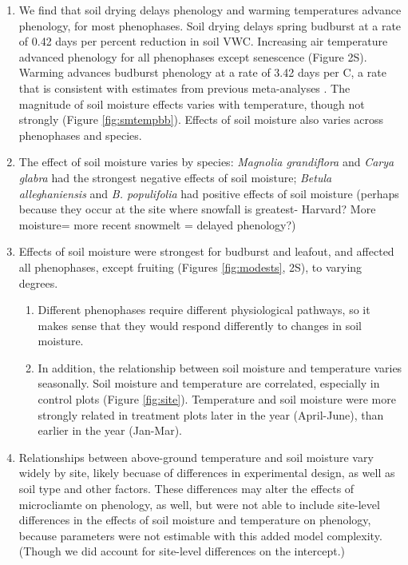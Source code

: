 \documentclass{article}
\begin{document}
\begin{enumerate}
\begin{enumerate}
\end{enumerate}
\item We find that soil drying delays phenology and warming temperatures advance phenology, for most phenophases. Soil drying delays spring budburst at a rate of 0.42 days per percent reduction in soil VWC. Increasing air temperature advanced phenology for all phenophases except senescence (Figure 2S). Warming advances budburst phenology at a rate of 3.42 days per \degree C, a rate that is consistent with estimates from previous meta-analyses \citep{wolkovich2012}. The magnitude of soil moisture effects varies with temperature, though not strongly (Figure \ref{fig:smtempbb}). Effects of soil moisture also varies across phenophases and species.  

\item The effect of soil moisture varies by species: \emph{Magnolia grandiflora} and \emph{Carya glabra} had the strongest negative effects of soil moisture; \emph{Betula alleghaniensis} and \emph{B. populifolia} had positive effects of soil moisture (perhaps because they occur at the site where snowfall is greatest- Harvard? More moisture= more recent snowmelt = delayed phenology?)
\item Effects of soil moisture were strongest for budburst and leafout, and affected all phenophases, except fruiting (Figures \ref{fig:modests}, 2S), to varying degrees. 
\begin{enumerate}
\item Different phenophases require different physiological pathways, so it makes sense that they would respond differently to changes in soil moisture. 
\item In addition, the relationship between soil moisture and temperature varies seasonally. Soil moisture and temperature are correlated, especially in control plots (Figure \ref{fig:site}). Temperature and soil moisture were more strongly related in treatment plots later in the year (April-June), than earlier in the year (Jan-Mar). 
\end{enumerate}
\item Relationships between above-ground temperature and soil moisture vary widely by site, likely becuase of differences in experimental design, as well as soil type and other factors. These differences may alter the effects of microcliamte on phenology, as well, but were not able to include site-level differences in the effects of soil moisture and temperature on phenology, because parameters were not estimable with this added model complexity. (Though we did account for site-level differences on the intercept.)

\end{enumerate}
\end{document}
